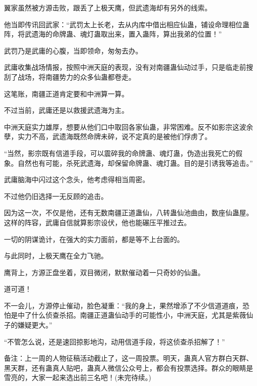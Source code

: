 \begin{this_body}
翼家虽然被方源击败，跟丢了上极天鹰，但武遗海却有另外的线索。

他当即传讯回武家：“武罚太上长老，去从内库中借出相应仙蛊，铺设命理相位蛊阵，将武遗海的命牌蛊、魂灯蛊取出来，置入蛊阵，算出我弟的位置！”

武罚乃是武庸的心腹，当即领命，匆匆去办。

武庸收集战场情报，按照中洲天庭的表现，没有对南疆蛊仙动过手，只是临走前搜刮了战场，将南疆势力的众多仙蛊都卷走。

这笔账，南疆正道肯定要和中洲算一算。

不过当前，武庸还是以救援武遗海为主。

中洲天庭实力雄厚，想要从他们口中取回各家仙蛊，非常困难。反不如影宗这波余孽，实力不高，武遗海既然命牌未碎，说不定真的是被他们俘虏了。

“当然，影宗既有信道手段，可以震碎我的命牌蛊、魂灯蛊，伪造出我死亡的假象。自然也有可能，杀死武遗海，却保留命牌蛊、魂灯蛊。目的是引诱我等追击。”

武庸脑海中闪过这个念头，他考虑得相当周密。

不过他仍旧选择一无反顾的追击。

因为这一次，不仅是他，还有无数南疆正道蛊仙，八转蛊仙池曲由，数座仙蛊屋。这样的阵容，武庸自信就算影宗设伏，他也能碾压平推过去。

一切的阴谋诡计，在强大的实力面前，都是等不上台面的。

与此同时，上极天鹰在全力飞驰。

鹰背上，方源正盘坐着，双目微闭，默默催动着一只奇妙的仙蛊。

道可道！

不一会儿，方源停止催动，脸色凝重：“我的身上，果然增添了不少信道道痕，恐怕是中了什么侦查杀招。南疆正道蛊仙动手的可能性小，中洲天庭，尤其是紫薇仙子的嫌疑更大。”

“不管怎么说，还是速回掠影地沟，动用信道手段，将这侦查杀招解了！”

备注：上一周的人物征稿活动截止了，这一周投票。明天，蛊真人官方群白天群、黑天群，还有蛊真人贴吧，蛊真人微信公众号上，都会有投票选择。群众的眼睛是雪亮的，大家一起来选出前三名吧！(未完待续。)

\end{this_body}

